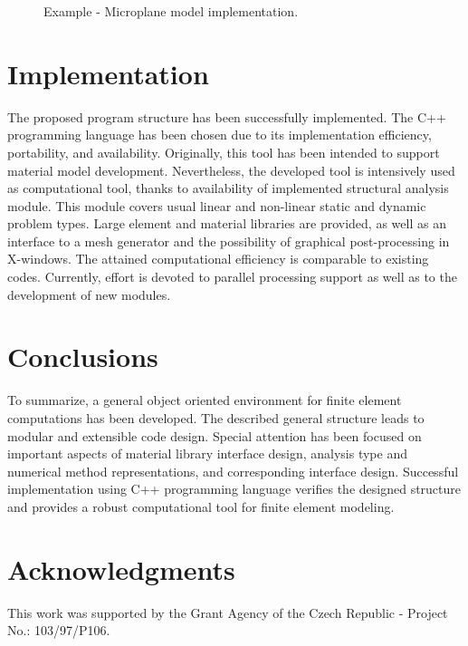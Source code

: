 \begin{htmlonly}
\begin{center}
\begin{figure}[tb]
\begin{center}\end{center}
\caption{Example - Microplane model implementation.}
\label{microplaneFig}
\end{figure}



\clearpage


\section{Implementation}
The proposed program structure has been successfully implemented. The C++
programming language has been chosen due to its implementation
efficiency, portability, and availability. Originally, this tool has
been intended  to support material model development. Nevertheless, the
developed tool is intensively used as computational tool, thanks to
availability of implemented structural analysis module. This module
covers usual linear and non-linear static and dynamic problem
types. Large element and material libraries are provided, as well as
an interface to a mesh generator and the possibility of graphical
post-processing in X-windows. The attained computational efficiency is
comparable to existing codes. Currently, effort is devoted to parallel
processing support as well as to the development of new modules. 



\section{Conclusions}
To summarize, a general object oriented environment for finite element computations has been developed.
The described general structure leads to modular and extensible code design.
Special attention has been focused on important aspects of material library interface design, analysis type and 
numerical method representations, and corresponding interface design.
Successful implementation using C++ programming language verifies
the designed structure and provides a robust computational tool for finite
element modeling.

\section*{Acknowledgments}
This work was supported by the Grant Agency of the Czech Republic -
Project No.: 103/97/P106.


\end{center}
\end{htmlonly}
